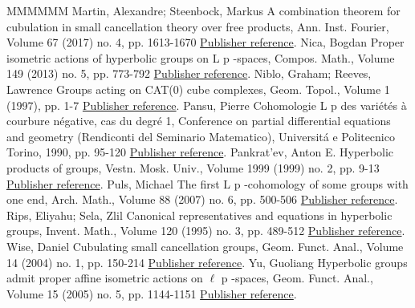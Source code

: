 \documentclass[11pt]{article}
\theoremstyle{definition}
\numberwithin{equation}{section}
\begin{document}
\begin{thebibliography}{MMMMMM}
 Martin, Alexandre; Steenbock, Markus A combination theorem for cubulation in small cancellation theory over free products, Ann. Inst. Fourier, Volume 67 (2017) no. 4, pp. 1613-1670 \href{https://ahl.centre-mersenne.org/item/AHL_2020__3__35_0/#MS}{Publisher reference}.
 Nica, Bogdan Proper isometric actions of hyperbolic groups on L p -spaces, Compos. Math., Volume 149 (2013) no. 5, pp. 773-792 \href{https://ahl.centre-mersenne.org/item/AHL_2020__3__35_0/#Ni}{Publisher reference}.
 Niblo, Graham; Reeves, Lawrence Groups acting on CAT(0) cube complexes, Geom. Topol., Volume 1 (1997), pp. 1-7 \href{https://ahl.centre-mersenne.org/item/AHL_2020__3__35_0/#NiRe}{Publisher reference}.
 Pansu, Pierre Cohomologie L p  des variétés à courbure négative, cas du degré 1, Conference on partial differential equations and geometry (Rendiconti del Seminario Matematico), Universitá e Politecnico Torino, 1990, pp. 95-120 \href{https://ahl.centre-mersenne.org/item/AHL_2020__3__35_0/#Pan}{Publisher reference}.
 Pankrat\textquoteright{}ev, Anton E. Hyperbolic products of groups, Vestn. Mosk. Univ., Volume 1999 (1999) no. 2, pp. 9-13 \href{https://ahl.centre-mersenne.org/item/AHL_2020__3__35_0/#Pankratev99}{Publisher reference}.
 Puls, Michael The first L p -cohomology of some groups with one end, Arch. Math., Volume 88 (2007) no. 6, pp. 500-506 \href{https://ahl.centre-mersenne.org/item/AHL_2020__3__35_0/#Puls}{Publisher reference}.
 Rips, Eliyahu; Sela, Zlil Canonical representatives and equations in hyperbolic groups, Invent. Math., Volume 120 (1995) no. 3, pp. 489-512 \href{https://ahl.centre-mersenne.org/item/AHL_2020__3__35_0/#RS95}{Publisher reference}.
 Wise, Daniel Cubulating small cancellation groups, Geom. Funct. Anal., Volume 14 (2004) no. 1, pp. 150-214 \href{https://ahl.centre-mersenne.org/item/AHL_2020__3__35_0/#Wise}{Publisher reference}.
 Yu, Guoliang Hyperbolic groups admit proper affine isometric actions on \(\ell\) p -spaces, Geom. Funct. Anal., Volume 15 (2005) no. 5, pp. 1144-1151 \href{https://ahl.centre-mersenne.org/item/AHL_2020__3__35_0/#Yu}{Publisher reference}.
\end{thebibliography}
\end{document}

